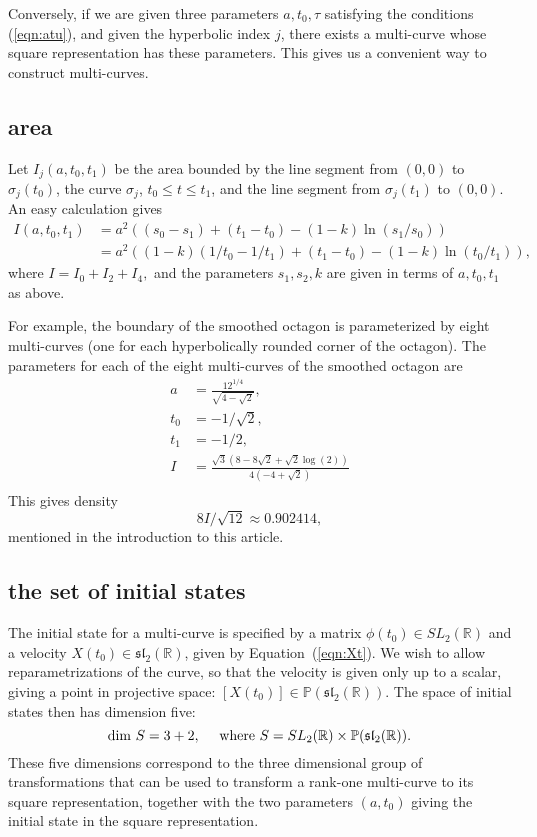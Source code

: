 \documentclass[11pt]{amsart}
\newcommand{\ring}[1]{\mathbb{#1}}
\def\ta{{\tau}}
\begin{document}
Conversely, if we are given three parameters $a,t_0,\ta$ satisfying
the conditions (\ref{eqn:atu}), and given the hyperbolic index $j$, 
there exists a multi-curve whose
square representation has these parameters.  This gives us a convenient
way to construct multi-curves.  

\subsection{area}

Let $I_j(a,t_0,t_1)$ be the area bounded by the line segment from $(0,0)$ to $\sigma_j(t_0)$, the curve $\sigma_j$, $t_0\le t\le t_1$, and the line segment from $\sigma_j(t_1)$ to $(0,0)$.  An easy calculation gives
\begin{equation}\label{eqn:I}
\begin{array}{lll}
 I(a,t_0,t_1) &=
  a^2((s_0-s_1)+(t_1-t_0) - (1-k)\ln (s_1/s_0))\\
 &= a^2 ((1-k) (1/t_0-1/t_1) + (t_1-t_0) -(1-k) \ln (t_0/t_1)),
\end{array}
\end{equation}
where 
$I=I_0+I_2+I_4,$ and the parameters $s_1,s_2,k$ are given in terms
of $a,t_0,t_1$ as above.

For example, the boundary of the 
smoothed octagon is parameterized by eight multi-curves (one for
each hyperbolically rounded corner of the octagon).  The parameters
for each of the eight multi-curves of the smoothed octagon are
$$
\begin{array}{lll}
a &= \frac{12^{1/4}}{\sqrt{4-\sqrt{2}}},\\
t_0 &= -1/\sqrt{2},\\
t_1 &= -1/2,\\
I &= \frac{\sqrt{3} \left(8-8 \sqrt{2}+\sqrt{2} \log (2)\right)}{4
   \left(-4+\sqrt{2}\right)}\\
\end{array}
$$
This gives density
$$8 I/\sqrt{12} \approx 0.902414,$$
mentioned in the introduction to this article.

\subsection{the set of initial states}



The initial state for a multi-curve is specified by a matrix
$\phi(t_0)\in SL_2(\ring{R})$ and a velocity $X(t_0)\in\mathfrak{sl}_2(\ring{R})$, given by Equation~(\ref{eqn:Xt}).  We wish to allow reparametrizations of the curve, so that the velocity is
given only up to a scalar, giving a point in projective space: $[X(t_0)]\in\ring{P}(\mathfrak{sl}_2(\ring{R}))$.
The space of initial states then has dimension five:
  $$\dim\, S = 3 + 2,\quad\hbox{ where } S = SL_2(\ring{R}) \times\ring{P}(\mathfrak{sl}_2(\ring{R})).$$
These five dimensions correspond to the three dimensional group of
transformations that can be used to transform a rank-one multi-curve
to its square representation, together with the two parameters $(a,t_0)$
giving the initial state in the square representation.
\end{document}
